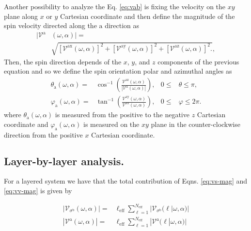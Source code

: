 \documentclass[prb,11pt,tightenlines,twocolumn,aps]{revtex4-1}
\begin{document}
{\color{red} Another possibility to analyze the Eq. \eqref{eq:vab} is fixing
the velocity on the $xy$ plane along $x$ or $y$ Cartesian coordinate and then
define the magnitude of the spin velocity directed along the $\mathrm{a}$
direction as}
\begin{align}
|\mathcal{V}^{\mathrm{a}}&(\omega,\alpha)| = \nonumber \\
&\sqrt { 
[\mathcal{V}^{\mathrm{ax}}(\omega,\alpha)]^{2} +
[\mathcal{V}^{\mathrm{ay}}(\omega,\alpha)]^{2} +
[\mathcal{V}^{\mathrm{az}}(\omega,\alpha)]^{2} .
},
\label{eq:vv-mag}
\end{align}
{\color{red} Then, the spin direction depends of the $x$, $y$, and $z$
components of the previous equation and so we define the spin orientation polar
and azimuthal angles as}
\begin{align}
\theta_{\mathrm{a}}  (\omega,\alpha)
=& 
\cos^{-1} \left( \frac{\mathcal{V}^{\mathrm{az}}(\omega,\alpha)}
{|\mathcal{V}^{\mathrm{a}}(\omega,\alpha)|} \right),
& 0 \leq &\theta \leq \pi, 
\label{eq:polar-ang}
\\
\varphi_{\mathrm{a}} (\omega,\alpha)
=& 
\tan^{-1} \left( \frac{\mathcal{V}^{\mathrm{ay}}(\omega,\alpha)}
{\mathcal{V}^{\mathrm{ax}}(\omega,\alpha)} \right),
& 0 \leq &\varphi \leq 2\pi.
\label{eq:azimuthal-ang} 
\end{align}
{\color{red} where $\theta_{\mathrm{a}}(\omega,\alpha)$ is measured from the
positive to the negative $z$ Cartesian coordinate and
$\varphi_{\mathrm{a}}(\omega,\alpha)$ is measured on the $xy$ plane in the
counter-clockwise direction from the positive $x$ Cartesian coordinate.}




\subsection{Layer-by-layer analysis.}\label{sec:theory-layer}

For a layered system we have that the total contribution of Eqns. 
\eqref{eq:vs-mag} and \eqref{eq:vv-mag} is given \cite{arzatePRB14} by 

\begin{align}
|\mathcal{V}_{\sigma^{\mathrm{b}}}(\omega,\alpha)|
=& 
\ell_{\mathrm{eff}}
\sum_{\ell=1}^{N_{\mathrm{eff}}}
|\mathcal{V}_{\sigma^{\mathrm{b}}} (\ell | \omega,\alpha)|
\label{eq:vs-layer}
\\
|\mathcal{V}^{\mathrm{a}}(\omega,\alpha)|
=&
\ell_{\mathrm{eff}}
\sum_{\ell=1}^{N_{\mathrm{eff}}}
|\mathcal{V}^{\mathrm{a}} (\ell | \omega,\alpha)|
\label{eq:vv-layer}
\end{align}
\end{document}
